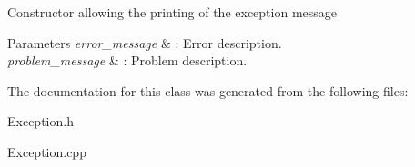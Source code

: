 Constructor allowing the printing of the exception message 
\begin{DoxyParams}{Parameters}
{\em error\+\_\+message} & \+: Error description. \\
\hline
{\em problem\+\_\+message} & \+: Problem description. \\
\hline
\end{DoxyParams}


The documentation for this class was generated from the following files\+:\begin{DoxyCompactItemize}
\item 
Exception.\+h\item 
Exception.\+cpp\end{DoxyCompactItemize}
